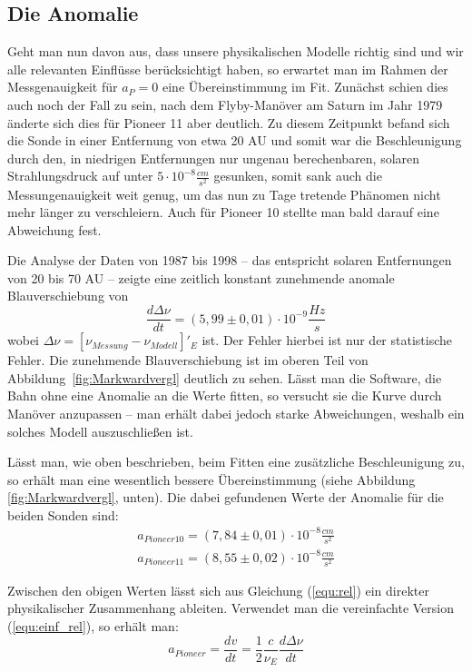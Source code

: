 \subsection{Die Anomalie}
Geht man nun davon aus, dass unsere physikalischen Modelle richtig sind und wir alle relevanten Einflüsse berücksichtigt haben, so erwartet man im Rahmen der Messgenauigkeit für $a_P = 0$ eine Übereinstimmung im Fit.
Zunächst schien dies auch noch der Fall zu sein, nach dem Flyby-Manöver am Saturn im Jahr 1979 änderte sich dies für Pioneer 11 aber deutlich. Zu diesem Zeitpunkt befand sich die Sonde in einer Entfernung von etwa 20 AU und somit war die Beschleunigung durch den, in niedrigen Entfernungen nur ungenau berechenbaren, solaren Strahlungsdruck auf unter $5 \cdot 10^{-8} \frac{cm}{s^2}$ gesunken,
somit sank auch die Messungenauigkeit weit genug, um das nun zu Tage tretende Phänomen nicht mehr länger zu verschleiern.
Auch für Pioneer 10 stellte man bald darauf eine Abweichung fest.

Die Analyse der Daten von 1987 bis 1998 – das entspricht solaren Entfernungen von 20 bis 70 AU –
zeigte eine zeitlich konstant zunehmende anomale Blauverschiebung von
\begin{equation}
  \frac{d\Delta\nu}{dt}=(5,99\pm0,01)\cdot10^{-9}\frac{Hz}{s}
\end{equation}
wobei $\Delta\nu=[\nu_{Messung}-\nu_{Modell}]'_E$ ist\cite{Dittus2006}. Der Fehler hierbei ist nur der statistische Fehler. Die zunehmende Blauverschiebung ist im oberen Teil von Abbildung~\ref{fig:Markwardvergl} deutlich zu sehen. Lässt man die Software, die Bahn ohne eine Anomalie an die Werte fitten, so versucht sie  die Kurve durch Manöver anzupassen – man erhält dabei jedoch starke Abweichungen, weshalb ein solches Modell auszuschließen ist\cite{Markwardt2002}.

Lässt man, wie oben beschrieben, beim Fitten eine zusätzliche Beschleunigung zu, so erhält man eine wesentlich bessere Übereinstimmung (siehe Abbildung \ref{fig:Markwardvergl}, unten). Die dabei gefundenen Werte der Anomalie für die beiden Sonden sind:
\begin{eqnarray}
  a_{Pioneer 10} = (7,84\pm0,01)\cdot10^{-8}\frac{cm}{s^2} \\  
  a_{Pioneer 11} = (8,55\pm0,02)\cdot10^{-8}\frac{cm}{s^2}
\end{eqnarray}

Zwischen den obigen Werten lässt sich aus Gleichung (\ref{equ:rel}) ein direkter physikalischer Zusammenhang ableiten. Verwendet man die vereinfachte Version (\ref{equ:einf_rel}), so erhält man:
\begin{equation}
  a_{Pioneer}=\frac{dv}{dt}=\frac{1}{2}\frac{c}{\nu_E}\frac{d\Delta\nu}{dt}
\end{equation}


